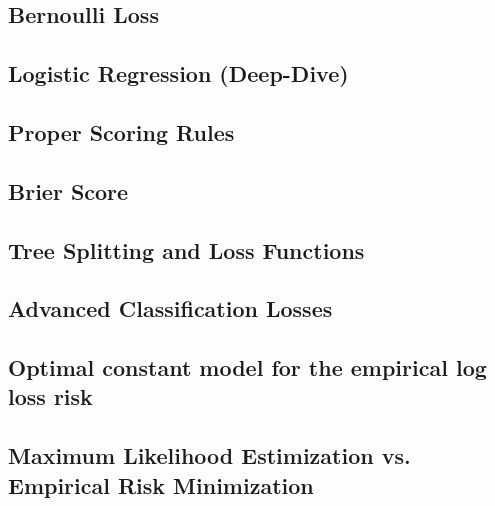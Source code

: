 \subsection{Bernoulli Loss}


\subsection{Logistic Regression (Deep-Dive)}


\subsection{Proper Scoring Rules}


\subsection{Brier Score}


\subsection{Tree Splitting and Loss Functions}


\subsection{Advanced Classification Losses}


\subsection{Optimal constant model for the empirical log loss risk}


\subsection{Maximum Likelihood Estimization vs. Empirical Risk Minimization}


